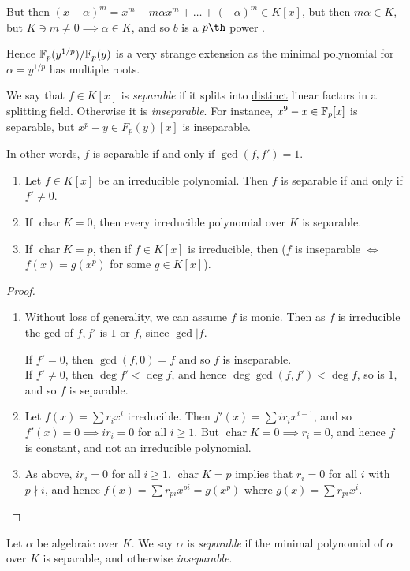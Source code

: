 \documentclass[a4paper, 10pt, twocolumn]{amsart}
\renewcommand{\charr}{\operatorname{char}}
\begin{document}
But then $(x-\alpha)^m = x^m - m\alpha x^m + \ldots + (-\alpha)^m \in K[x]$, but then $m\alpha \in K$, but $K \ni m \neq 0 \implies \alpha \in K$, and so $b$ is a $p\th$ power \contr.

Hence $\mathbb{F}_p(y^{1/p}) / \mathbb{F}_p(y)$ is a very strange extension as the minimal polynomial for $\alpha = y^{1/p}$ has multiple roots.

We say that $f \in K[x]$ is \emph{separable} if it splits into \underline{distinct} linear factors in a splitting field. Otherwise it is \emph{inseparable}. For instance, $x^9-x \in \mathbb{F}_p[x]$ is separable, but $x^p-y \in F_p(y)[x]$ is inseparable.

In other words, $f$ is separable if and only if $\gcd(f,f') = 1$.
\begin{proposition}
\item
\begin{enumerate}
\item Let $f\in K[x]$ be an irreducible polynomial. Then $f$ is separable if and only if $f' \neq 0$.
\item If $\charr K = 0$, then every irreducible polynomial over $K$ is separable.
\item If $\charr K = p$, then if $f \in K[x]$ is irreducible, then ($f$ is inseparable $\iff$ $f(x) = g(x^p)$ for some $g \in K[x]$).
\end{enumerate}
\end{proposition}
\begin{proof}
\item
\begin{enumerate}
\item Without loss of generality, we can assume $f$ is monic. Then as $f$ is irreducible the gcd of $f, f'$ is $1$ or $f$, since $\gcd | f$.

If $f'=0$, then $\gcd(f,0) = f$ and so $f$ is inseparable.\\
If $f'\neq 0$, then $\deg f' < \deg f$, and hence $\deg\gcd(f,f')<\deg f$, so is $1$, and so $f$ is separable.
\item Let $f(x) = \sum r_i x^i$ irreducible. Then $f'(x) = \sum i r_i x^{i-1}$, and so $f'(x) = 0 \implies ir_i = 0$ for all $i\geq 1$. But $\charr K = 0 \implies r_i = 0$, and hence $f$ is constant, and not an irreducible polynomial.

\item As above, $ir_i = 0$ for all $i\geq 1$. $\charr K = p$ implies that $r_i = 0$ for all $i$ with $p\nmid i$, and hence $f(x) = \sum r_{pi}x^{pi} = g(x^p)$ where $g(x) = \sum r_{pi}x^i$.
\end{enumerate}
\end{proof}
Let $\alpha$ be algebraic over $K$. We say $\alpha$ is \emph{separable} if the minimal polynomial of $\alpha$ over $K$ is separable, and otherwise \emph{inseparable}.
\end{document}
